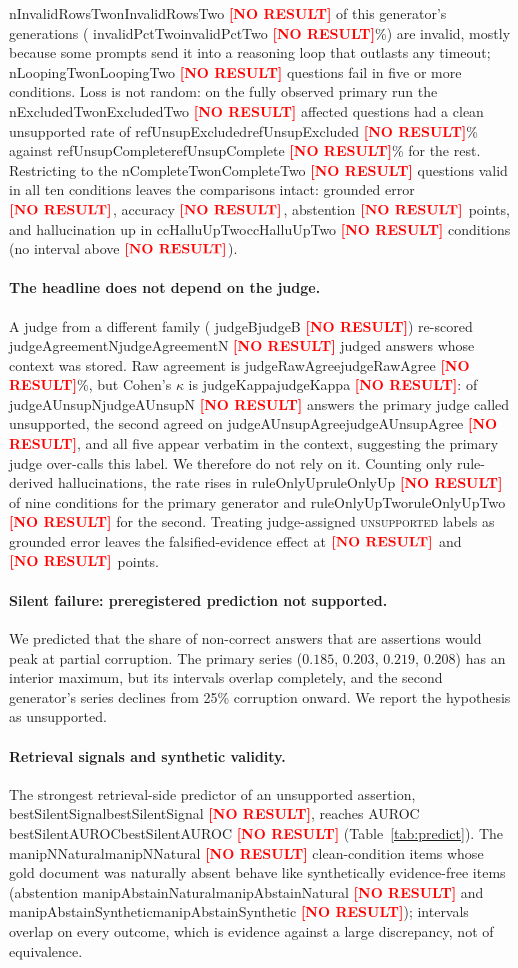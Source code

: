 \documentclass[11pt]{article}
\newcommand{\NUM}[1]{%
  \ifcsname #1\endcsname\csname #1\endcsname\else
  \textcolor{red}{\textbf{[NO RESULT]}}\fi}
\begin{document}
\NUM{nInvalidRowsTwo} of this generator's generations (\NUM{invalidPctTwo}\%) are
invalid, mostly because some prompts send it into a reasoning loop that outlasts any
timeout; \NUM{nLoopingTwo} questions fail in five or more conditions. Loss is not
random: on the fully observed primary run the \NUM{nExcludedTwo} affected questions had
a clean unsupported rate of \NUM{refUnsupExcluded}\% against \NUM{refUnsupComplete}\%
for the rest. Restricting to the \NUM{nCompleteTwo} questions valid in all ten
conditions leaves the comparisons intact: grounded error \(\NUM{ccDeltaGroundedTwo}\),
accuracy \(\NUM{ccDeltaCorrectTwo}\), abstention \(\NUM{ccDeltaAbstainTwo}\) points,
and hallucination up in \NUM{ccHalluUpTwo} conditions (no interval above
\(\NUM{ccHalluUpperTwo}\)).

\paragraph{The headline does not depend on the judge.}
A judge from a different family (\NUM{judgeB}) re-scored \NUM{judgeAgreementN} judged
answers whose context was stored. Raw agreement is \NUM{judgeRawAgree}\%, but Cohen's
\(\kappa\) is \NUM{judgeKappa}: of \NUM{judgeAUnsupN} answers the primary judge called
unsupported, the second agreed on \NUM{judgeAUnsupAgree}, and all five appear verbatim
in the context, suggesting the primary judge over-calls this label. We therefore do
not rely on it. Counting only rule-derived hallucinations, the rate rises in
\NUM{ruleOnlyUp} of nine conditions for the primary generator and \NUM{ruleOnlyUpTwo}
for the second. Treating judge-assigned \textsc{unsupported} labels as grounded error
leaves the falsified-evidence effect at \(\NUM{reclassGroundedCF}\) and
\(\NUM{reclassGroundedCFTwo}\) points.

\paragraph{Silent failure: preregistered prediction not supported.}
We predicted that the share of non-correct answers that are assertions would peak at
partial corruption. The primary series ($0.185$, $0.203$, $0.219$, $0.208$) has an
interior maximum, but its intervals overlap completely, and the second generator's
series declines from 25\% corruption onward. We report the hypothesis as unsupported.

\paragraph{Retrieval signals and synthetic validity.}
The strongest retrieval-side predictor of an unsupported assertion, \NUM{bestSilentSignal},
reaches AUROC \NUM{bestSilentAUROC} (Table~\ref{tab:predict}). The \NUM{manipNNatural}
clean-condition items whose gold document was naturally absent behave like
synthetically evidence-free items (abstention \NUM{manipAbstainNatural} and
\NUM{manipAbstainSynthetic}); intervals overlap on every outcome, which is evidence
against a large discrepancy, not of equivalence.
\end{document}
